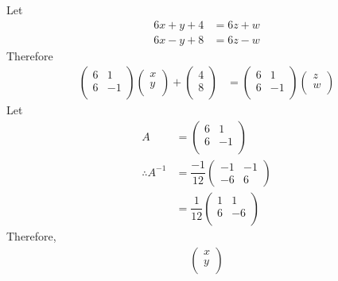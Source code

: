 \documentclass[fleqn, a4paper, 12pt, oneside]{amsart}
\theoremstyle{definition}
\theoremstyle{theorem}
\begin{document}
\begin{solution}
	Let
	\begin{align*}
		6x + y + 4 &= 6z + w\\
		6x - y + 8 &= 6z - w
	\end{align*}
	Therefore
	\begin{align*}
			\begin{pmatrix}
				6 & 1\\
				6 & -1\\
			\end{pmatrix}
			\begin{pmatrix}
				x\\
				y\\
			\end{pmatrix}
		+
			\begin{pmatrix}
				4\\
				8\\
			\end{pmatrix}
		&=
			\begin{pmatrix}
				6 & 1\\
				6 & -1\\
			\end{pmatrix}
			\begin{pmatrix}
				z\\
				w\\
			\end{pmatrix}
	\end{align*}
	Let
	\begin{align*}
		A &=
			\begin{pmatrix}
				6 & 1\\
				6 & -1\\
			\end{pmatrix}\\
		\therefore A^{-1} &=
			\dfrac{-1}{12}
			\begin{pmatrix}
				-1 & -1\\
				-6 & 6
			\end{pmatrix}\\
		&=
			\dfrac{1}{12}
			\begin{pmatrix}
				1 & 1\\
				6 & -6\\
			\end{pmatrix}
	\end{align*}
	Therefore,
	\begin{align*}
			\begin{pmatrix}
				x\\
				y\\
			\end{pmatrix}

\end{align*}
\end{solution}
\end{document}
